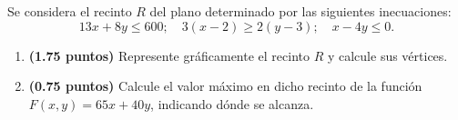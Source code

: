 
Se considera el recinto $R$ del plano determinado por las siguientes inecuaciones:
\[
13x+8y\leq600;\quad3(x-2)\geq2(y-3);\quad x-4y\leq0.
\]
\begin{enumerate}[label=\alph*)]
\item \textbf{(1.75 puntos)} Represente gráficamente el recinto $R$ y calcule sus vértices.
\item \textbf{(0.75 puntos)} Calcule el valor máximo en dicho recinto de la función $F(x,y)=65x+40y$, indicando dónde se alcanza.
\end{enumerate}
